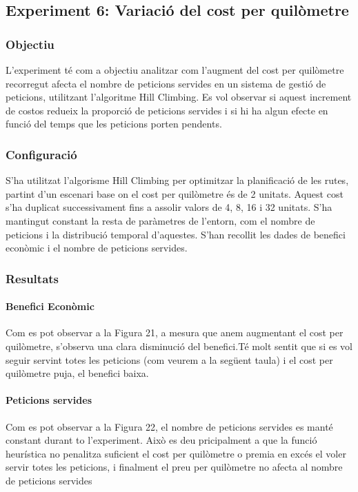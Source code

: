 
\subsection{Experiment 6: Variació del cost per quilòmetre}

\subsubsection{Objectiu}
L'experiment té com a objectiu analitzar com l'augment del cost per quilòmetre recorregut afecta el nombre de peticions servides en un sistema de gestió de peticions, utilitzant l'algoritme Hill Climbing. Es vol observar si aquest increment de costos redueix la proporció de peticions servides i si hi ha algun efecte en funció del temps que les peticions porten pendents.

\subsubsection{Configuració}
S'ha utilitzat l'algorisme Hill Climbing per optimitzar la planificació de les rutes, partint d'un escenari base on el cost per quilòmetre és de 2 unitats. Aquest cost s'ha duplicat successivament fins a assolir valors de 4, 8, 16 i 32 unitats. S'ha mantingut constant la resta de paràmetres de l'entorn, com el nombre de peticions i la distribució temporal d'aquestes. S'han recollit les dades de benefici econòmic i el nombre de peticions servides.

\subsubsection{Resultats}

\paragraph{Benefici Econòmic}
Com es pot observar a la Figura 21, a mesura que anem augmentant el cost per quilòmetre, s'observa una clara disminució del benefici.Té molt sentit que si es vol seguir servint totes les peticions (com veurem a la següent taula) i el cost per quilòmetre puja, el benefici baixa.



\paragraph{Peticions servides}
Com es pot observar a la Figura 22, el nombre de peticions servides es manté constant durant to l'experiment. Això es deu pricipalment a que la funció heurística no penalitza suficient el cost per quilòmetre o premia en excés el voler servir totes les peticions, i finalment el preu per quilòmetre no afecta al nombre de peticions servides 


